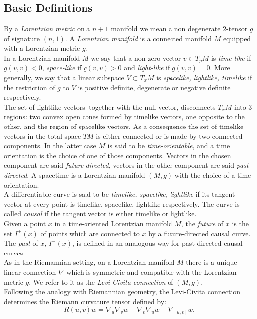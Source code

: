 \subsection{Basic Definitions}
By a \textit{Lorentzian metric} on a $n+1$ manifold we mean a non degenerate $2$-tensor $g$ of signature $(n,1)$. A \textit{Lorentzian manifold} is a connected manifold $M$ equipped with a Lorentzian metric $g$.\\
In a Lorentzian manifold $M$ we say that a non-zero vector $v \in T_pM$ is \textit{time-like} if $g(v,v)<0$, \textit{space-like} if $g(v,v)>0$ and \textit{light-like} if $g(v,v)=0$. More generally, we say that a linear subspace $V \subset T_{x}M$ is \textit{spacelike, lightlike, timelike} if the restriction of $g$ to $V$ is positive definite, degenerate or negative definite respectively.\\
The set of lightlike vectors, together with the null vector, disconnects $T_{x}M$ into 3 regions: two convex open cones formed by timelike vectors, one opposite to the other, and the region of spacelike vectors. As a consequence the set of timelike vectors in the total space $TM$ is either connected or is made by two connected components. In the latter case $M$ is said to be \textit{time-orientable}, and a time orientation is the choice of one of those components. Vectors in the chosen component are said \textit{future-directed}, vectors in the other component are said \textit{past-directed}. A spacetime is a Lorentzian manifold $(M,g)$ with the choice of a time orientation.\\
A differentiable curve is said to be \textit{timelike, spacelike, lightlike} if its tangent vector at every point is timelike, spacelike, lightlike respectively. The curve is called \textit{causal} if the tangent vector is either timelike or lightlike. \\ Given a point $x$ in a time-oriented Lorentzian manifold $M$, the \textit{future} of $x$ is the set $I^+(x)$ of points which are connected to $x$ by a future-directed causal curve. The \textit{past} of $x$, $I^-(x)$, is defined in an analogous way for past-directed causal curves.\\As in the Riemannian setting, on a Lorentzian manifold $M$ there is a unique linear connection $\nabla$ which is symmetric and compatible with the Lorentzian metric $g$. We refer to it as the \textit{Levi-Civita connection} of $(M,g)$.\\ Following the analogy with Riemannian geometry, the Levi-Civita connection determines the Riemann curvature tensor defined by: 
\[
    R(u,v)w=\nabla_u\nabla_v w-\nabla_v\nabla_u w-\nabla_{[u,v]}w.
\]  

